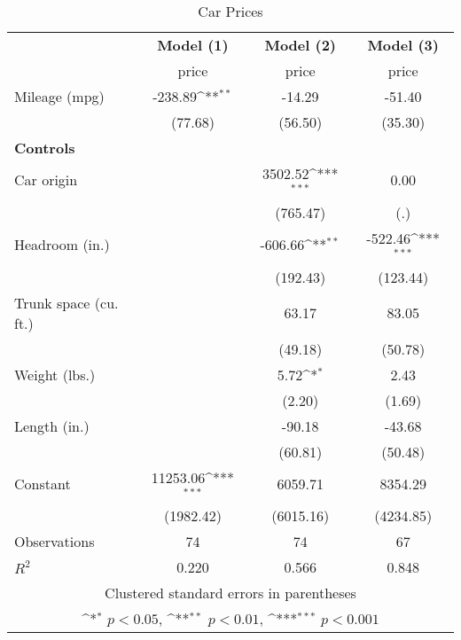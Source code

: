 \begin{table}[htbp]\centering
\def\sym#1{\ifmmode^{#1}\else\(^{#1}\)\fi}
\caption{Car Prices \label{reg_prices}}
\begin{tabular}{l*{3}{c}}
\toprule
                    &\multicolumn{1}{c}{\textbf{Model (1)}}&\multicolumn{1}{c}{\textbf{Model (2)}}&\multicolumn{1}{c}{\textbf{Model (3)}}\\
                    &       price         &       price         &       price         \\
\midrule
Mileage (mpg)       &     -238.89\sym{**} &      -14.29         &      -51.40         \\
                    &     (77.68)         &     (56.50)         &     (35.30)         \\
\textbf{Controls}   &                     &                     &                     \\
Car origin          &                     &     3502.52\sym{***}&        0.00         \\
                    &                     &    (765.47)         &         (.)         \\
Headroom (in.)      &                     &     -606.66\sym{**} &     -522.46\sym{***}\\
                    &                     &    (192.43)         &    (123.44)         \\
Trunk space (cu. ft.)&                     &       63.17         &       83.05         \\
                    &                     &     (49.18)         &     (50.78)         \\
Weight (lbs.)       &                     &        5.72\sym{*}  &        2.43         \\
                    &                     &      (2.20)         &      (1.69)         \\
Length (in.)        &                     &      -90.18         &      -43.68         \\
                    &                     &     (60.81)         &     (50.48)         \\
Constant            &    11253.06\sym{***}&     6059.71         &     8354.29         \\
                    &   (1982.42)         &   (6015.16)         &   (4234.85)         \\
\midrule
Observations        &          74         &          74         &          67         \\
\(R^{2}\)           &       0.220         &       0.566         &       0.848         \\
\bottomrule
\multicolumn{4}{c}{\footnotesize Clustered standard errors in parentheses}\\
\multicolumn{4}{c}{\footnotesize \sym{*} \(p<0.05\), \sym{**} \(p<0.01\), \sym{***} \(p<0.001\)}\\
\end{tabular}
\end{table}
